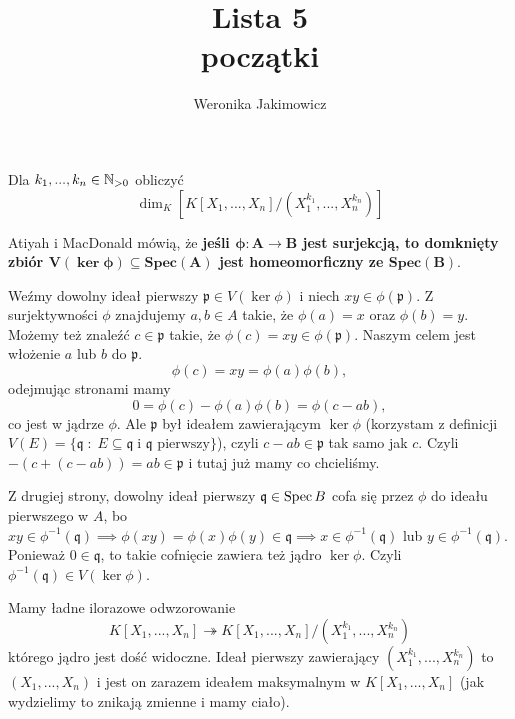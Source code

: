 \documentclass{article}
\title{Lista 5\\{\large początki}}
\author{Weronika Jakimowicz}
\date{}
\begin{document}
\maketitle

\begin{problem}{1}
  Dla $k_1,...,k_n\in\mathbb{N}_{>0}$ obliczyć
  $$\dim_K\left[K[X_1,..., X_n]/(X_1^{k_1},..., X_n^{k_n})\right]$$
\end{problem}

Atiyah i MacDonald mówią, że {\bfseries jeśli $\boldsymbol{\phi:A\to B}$ jest surjekcją, to domknięty zbiór $\boldsymbol{V(\ker\phi)\subseteq \text{Spec}(A)}$ jest homeomorficzny ze $\boldsymbol{\text{Spec}(B)}$}. 

Weźmy dowolny ideał pierwszy $\mathfrak{p}\in V(\ker\phi)$ i niech $xy\in \phi(\mathfrak{p})$. Z surjektywności $\phi$ znajdujemy $a,b\in A$ takie, że $\phi(a)=x$ oraz $\phi(b)=y$. Możemy też znaleźć $c\in \mathfrak{p}$ takie, że $\phi(c)=xy\in\phi(\mathfrak{p})$. Naszym celem jest włożenie $a$ lub $b$ do $\mathfrak{p}$.
$$\phi(c)=xy=\phi(a)\phi(b),$$
odejmując stronami mamy
$$0=\phi(c)-\phi(a)\phi(b)=\phi(c-ab),$$
co jest w jądrze $\phi$. Ale $\mathfrak{p}$ był ideałem zawierającym $\ker\phi$ (korzystam z definicji $V(E)=\{\mathfrak{q}\;:\;E\subseteq \mathfrak{q}\;\text{i }\mathfrak{q}\text{ pierwszy}\}$), czyli $c-ab\in\mathfrak{p}$ tak samo jak $c$. Czyli $-(c+(c-ab))=ab\in\mathfrak{p}$ i tutaj już mamy co chcieliśmy.

Z drugiej strony, dowolny ideał pierwszy $\mathfrak{q}\in\operatorname{Spec} B$ cofa się przez $\phi$ do ideału pierwszego w $A$, bo $xy\in\phi^{-1}(\mathfrak{q})\implies \phi(xy)=\phi(x)\phi(y)\in\mathfrak{q}\implies x\in\phi^{-1}(\mathfrak{q})$ lub $y\in\phi^{-1}(\mathfrak{q})$. Ponieważ $0\in\mathfrak{q}$, to takie cofnięcie zawiera też jądro $\ker\phi$. Czyli $\phi^{-1}(\mathfrak{q})\in V(\ker\phi)$.
\begin{center}
\end{center}
\begin{flushright}
\end{flushright}

Mamy ładne ilorazowe odwzorowanie 
$$K[X_1,..., X_n]\twoheadrightarrow K[X_1,...,X_n]/(X_1^{k_1},...,X_n^{k_n})$$
którego jądro jest dość widoczne. Ideał pierwszy zawierający $(X_1^{k_1},..., X_n^{k_n})$ to $(X_1,...,X_n)$ i jest on zarazem ideałem maksymalnym w $K[X_1,..., X_n]$ (jak wydzielimy to znikają zmienne i mamy ciało).
\end{document}
